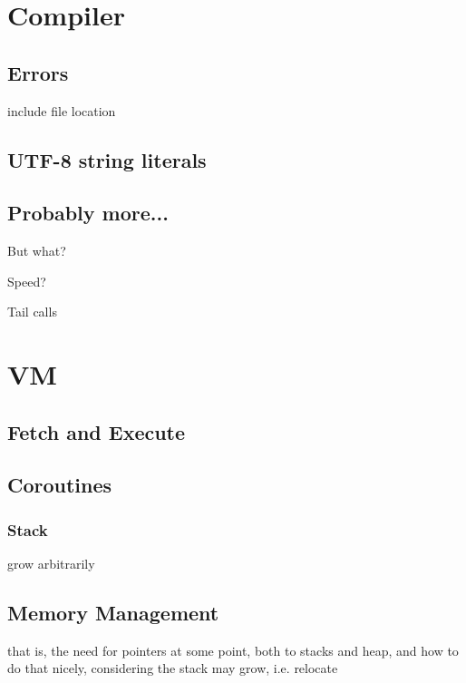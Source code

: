 	
	\section{Compiler}
	
		\subsection{Errors}
		
			include file location
		
		\subsection{UTF-8 string literals}
		    
		\subsection{Probably more...}
		
			But what?
			
			Speed?
			
			Tail calls
        
    \section{VM}
        
        \subsection{Fetch and Execute}
            
        \subsection{Coroutines}
            
            \subsubsection{Stack}
                
                grow arbitrarily
            
        \subsection{Memory Management}
            
            that is, the need for pointers at some point, both to stacks and heap, and how to do that nicely, considering the stack may grow, i.e. relocate
    
